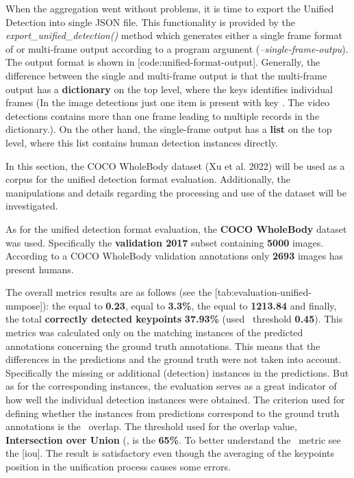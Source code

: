 When the aggregation went without problems, it is time to export the Unified Detection into single JSON file. This functionality is provided by the {\it export_unified_detection()} method which generates either a single frame format of or multi-frame output according to a program argument ({\it --single-frame-outpu}). The output format is shown in [code:unified-format-output]. Generally, the difference between the single and multi-frame output is that the multi-frame output has a {\bf dictionary} on the top level, where the keys identifies individual frames (In the image detections just one item is present with key . The video detections contains more than one frame leading to multiple records in the dictionary.). On the other hand, the single-frame output has a {\bf list} on the top level, where this list contains human detection instances directly.


In this section, the COCO WholeBody dataset (Xu et al. 2022) will be used as a corpus for the unified detection format evaluation. Additionally, the manipulations and details regarding the processing and use of the dataset will be investigated.

As for the unified detection format evaluation, the {\bf COCO WholeBody} dataset was used. Specifically the {\bf validation 2017} subset containing {\bf 5000} images. According to a COCO WholeBody validation annotations only {\bf 2693} images has present humans. 

The overall metrics results are as follows (see the [tab:evaluation-unified-mmpose]): the {\bf \OKS} equal to {\bf 0.23}, {\bf \APE} equal to {\bf 3.3\%}, the {\bf \MSE} equal to {\bf 1213.84} and finally, the total {\bf correctly detected keypoints} {\bf 37.93\%} (used \OKS\ threshold {\bf 0.45}). This metrics was calculated only on the matching instances of the predicted annotations concerning the ground truth annotations. This means that the differences in the predictions and the ground truth were not taken into account. Specifically the missing or additional (detection) instances in the predictions. But as for the corresponding instances, the evaluation serves as a great indicator of how well the individual detection instances were obtained. The criterion used for defining whether the instances from predictions correspond to the ground truth annotations is the \BBOX\ overlap. The threshold used for the overlap value, {\bf Intersection over Union} (\IoU\), is the {\bf 65\%}. To better understand the \IoU\ metric see the [iou]. The result is satisfactory even though the averaging of the keypoints position in the unification process causes some errors.

